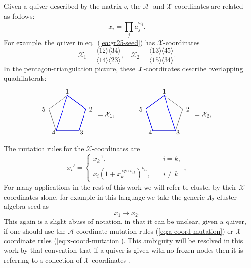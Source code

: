 \documentclass[11pt]{article}
\DeclareMathOperator{\sgn}{sgn}
\def\ket#1{\langle #1 \rangle}
\def\x{\mathcal{X}}
\def\xcoord{$\mathcal{X}$-coordinate }
\def\xcoords{$\mathcal{X}$-coordinates }
\def\a{\mathcal{A}}
\def\acoord{$\mathcal{A}$-coordinate }
\def\drawLabeledPentagon{
\coordinate (P1) at (90:1);
\coordinate (P2) at (18:1);
\coordinate (P3) at (306:1);
\coordinate (P4) at (234:1);
\coordinate (P5) at (162:1);
\draw (P1) -- (P2) -- (P3) -- (P4) -- (P5) -- cycle;
\draw (0,1.2) node {1};
\draw (1,.3) node[anchor=west] {2};
\draw (.5,-.9) node[anchor=west] {3};
\draw (-.5,-.9) node[anchor=east] {4};
\draw (-1,.3) node[anchor=east] {5};
}
\begin{document}
Given a quiver described by the matrix $b$, the $\a$- and $\x$-coordinates are related as follows:
\begin{equation}
	x_i = \prod_j a_j^{b_{ij}}. 	
\end{equation} 
For example, the quiver in eq.~(\ref{eq:gr25-seed}) has $\x$-coordinates 
\begin{equation}\label{def:xcoordsA2}
	\x_1 = \frac{\ket{12}\ket{34}}{\ket{14}\ket{23}}, \quad \x_2 = \frac{\ket{13}\ket{45}}{\ket{15}\ket{34}}.
\end{equation}
In the pentagon-triangulation picture, these $\x$-coordinates describe overlapping quadrilaterals:
\begin{equation}
\begin{gathered}
\begin{tikzpicture}
  \drawLabeledPentagon
  \draw[color=blue, thick] (P1) -- (P2) -- (P3) -- (P4) -- cycle;
  \draw (2,0) node {$=\x_1,$};
\begin{scope}[xshift = 5cm]
  \drawLabeledPentagon
  \draw[color=blue, thick] (P1) -- (P3) -- (P4) -- (P5) -- cycle;
  \draw (2,0) node {$=\x_2,$};
\end{scope}
\end{tikzpicture} 
\end{gathered}
\end{equation}
The mutation rules for the $\x$-coordinates are
\begin{equation}
  \label{eq:x-coord-mutation}
  x_{i}' =
  \begin{cases}
    x_{k}^{-1}, &\quad i=k,\\
    x_{i} (1+x_{k}^{\sgn b_{i k}})^{b_{i k}}, &\quad i \neq k
  \end{cases},
\end{equation}
For many applications in the rest of this work we will refer to cluster by their $\x$-coordinates alone, for example in this language we take the generic $A_2$ cluster algebra seed as 
\begin{equation}
	x_1 \to x_2.
\end{equation}
This again is a slight abuse of notation, in that it can be unclear, given a quiver, if one should use the \acoord mutation rules (\ref{eq:a-coord-mutation}) or \xcoord rules (\ref{eq:x-coord-mutation}). This ambiguity will be resolved in this work by that convention that if a quiver is given with no frozen nodes then it is referring to a collection of \xcoords. 
\end{document}
